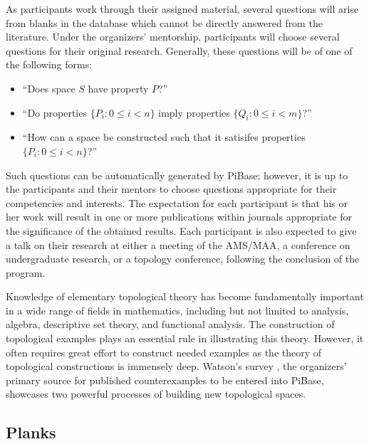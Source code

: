   As participants work through their assigned material, several questions will
  arise from blanks in the database which cannot be directly
  answered from the literature.
  Under the organizers' mentorship, participants will choose several questions
  for their original research. Generally, these questions will be of one of the
  following forms:
  \begin{itemize}
    \item ``Does space \(S\) have property \(P\)?''
    \item ``Do properties \(\{P_i:0\leq i<n\}\) imply properties
            \(\{Q_i:0\leq i<m\}\)?''
    \item ``How can a space be constructed such that it satisifes properties
            \(\{P_i:0\leq i<n\}\)?''
  \end{itemize}
  Such questions can be automatically generated by PiBase; however, it is up
  to the participants and their mentors to choose questions appropriate for
  their competencies and interests. The expectation for each participant
  is that his or her work will result in one or more publications within
  journals appropriate for the significance of the obtained results. Each
  participant is also expected to give a talk on their research
  at either a meeting of the AMS/MAA, a conference on undergraduate research,
  or a topology conference, following the conclusion of the program.

  Knowledge of elementary topological theory has become fundamentally important
  in a wide range of fields in mathematics, including but not limited
  to analysis, algebra, descriptive set theory, and functional analysis.
  The construction of topological examples plays an essential rule in
  illustrating this theory. However, it often requires great
  effort to construct needed examples as the theory of topological constructions
  is immensely deep. Watson's survey \cite{MR1229141}, the organizers' primary
  source for published counterexamples to be entered into PiBase,
  showcases two powerful processes of building new topological spaces.

  \subsection{Planks}

